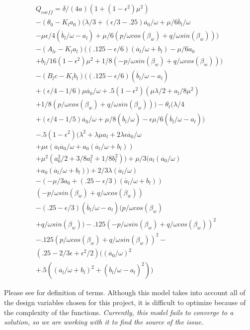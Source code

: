 \documentclass[letterpaper, 10 pt, conference]{ieeeconf}  %
\begin{document}
\begin{multline}
Q_{coeff} = \delta/(4 a) (1 + (1-\epsilon^2) \mu^2) \\
 - (\theta_0 - K_l a_0)(\lambda/3+(\epsilon/3-.25) \dot{a_0}/\omega + \mu/6 \dot{b_l}/\omega\\  
- \mu \epsilon/4 (\dot{b_l}/\omega-a_l) + \mu/6 (p/\omega cos(\beta_w) +q/\omega sin(\beta_w))) \\
- (A_{lc}-K_l a_l) ((.125-\epsilon/6) (\dot{a_l}/\omega+b_l)-\mu/6 a_0 \\
+b_l/16 (1-\epsilon^2) \mu^2+1/8 (-p/\omega sin(\beta_w)+q/\omega cos(\beta_w)))\\ 
- (B_lc-K_l b_l) ((.125-\epsilon/6) (\dot{b_l}/\omega-a_l)\\
+(\epsilon/4-1/6) \mu \dot{a_0}/\omega+.5 (1-\epsilon^2) (\mu \lambda/2+a_l/8 \mu^2)\\ 
+ 1/8 (p/\omega cos(\beta_w)+q/\omega sin(\beta_w))) - \theta_t (\lambda/4\\ 
+ (\epsilon/4-1/5) \dot{a_0}/\omega+\mu/8 (\dot{b_l}/\omega)-\epsilon \mu/6 (\dot{b_l}/\omega-a_l))\\  
- .5 (1-\epsilon^2) (\lambda^2+\lambda \mu a_l+2 \lambda \epsilon \dot{a_0}/\omega\\  
+\mu \epsilon (a_l \dot{a_0}/\omega+a_0 (\dot{a_l}/\omega+b_l))\\  
+ \mu^2 (a_0^2/2+3/8 a_l^2+1/8 b_l^2)) + \mu/3 (a_l (\dot{a_0}/\omega) \\
+ a_0 (\dot{a_l}/\omega+b_l))+2/3 \lambda (\dot{a_l}/\omega)\\  
- (-\mu/3 a_0 + (.25-\epsilon/3) (\dot{a_l}/\omega+b_l)) \\ 
(-p/\omega sin(\beta_w)+q/\omega cos(\beta_w))\\ 
- (.25-\epsilon/3) (\dot{b_l}/\omega-a_l) (p/\omega cos(\beta_w)\\ 
+ q/\omega sin(\beta_w)) - .125 (-p/\omega sin(\beta_w)+q/\omega cos(\beta_w))^2 \\ 
-.125 (p/\omega cos(\beta_w)+q/\omega sin(\beta_w))^2 -  \\
(.25-2/3 \epsilon+\epsilon^2/2) ((\dot{a_0}/\omega)^2 \\ 
+ .5 ((\dot{a_l}/\omega+b_l)^2+(\dot{b_l}/\omega-a_l)^2))
\label{torquecoeff}
\end{multline}

Please see \cite{chen1979simplified} for definition of terms. Although this model takes into account all of the design variables chosen for this project, it is difficult to optimize because of the complexity of the functions. \textit{Currently, this model fails to converge to a solution, so we are working with it to find the source of the issue.}
\end{document}
